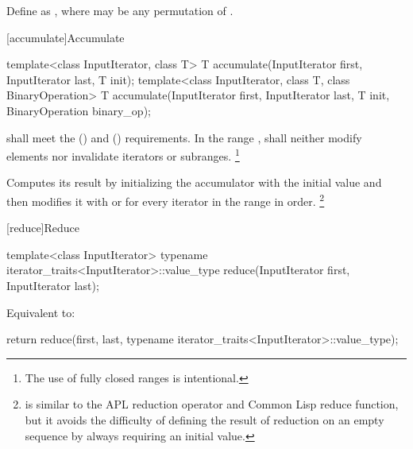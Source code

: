 %
\pnum
Define  as
,
where
 may be any permutation of .

[accumulate]{Accumulate}

%
\begin{itemdecl}
template<class InputIterator, class T>
  T accumulate(InputIterator first, InputIterator last, T init);
template<class InputIterator, class T, class BinaryOperation>
  T accumulate(InputIterator first, InputIterator last, T init,
               BinaryOperation binary_op);
\end{itemdecl}

\begin{itemdescr}
\pnum
\requires
{} shall meet
the  ()
and  () requirements.
In the range ,
 shall neither modify elements
nor invalidate iterators or subranges.%
\footnote{The use of fully closed ranges is intentional.}

\pnum
\effects
Computes its result by
initializing the accumulator  with the initial value 
and then modifies it with
 or
for every iterator  in the range  in order.%
\footnote{ is similar
to the APL reduction operator and Common Lisp reduce function,
but it avoids the difficulty of defining the result of reduction
on an empty sequence by always requiring an initial value.}
\end{itemdescr}

[reduce]{Reduce}

%
\begin{itemdecl}
template<class InputIterator>
  typename iterator_traits<InputIterator>::value_type
    reduce(InputIterator first, InputIterator last);
\end{itemdecl}

\begin{itemdescr}
\pnum
\effects
Equivalent to:
\begin{codeblock}
return reduce(first, last,
              typename iterator_traits<InputIterator>::value_type{});
\end{codeblock}
\end{itemdescr}

